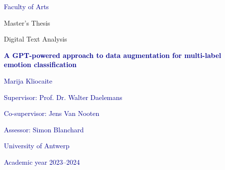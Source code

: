 \thispagestyle{plain}
    \begin{center}
    
        \vspace*{1cm}

        \large
        \textcolor{darkblue}{Faculty of Arts}
        
        \vspace{0.5cm}
        Master’s Thesis 
        
        \vspace{0.5cm}
        Digital Text Analysis 
        
       \vspace{1.5cm}
            
        \Huge
        \textcolor{darkblue}{\textbf{A GPT-powered approach 
to data augmentation for 
multi-label emotion 
classification}}
            
        \vspace{0.5cm}
        \LARGE
        \textcolor{darkblue}{}
            
        \vspace{1.5cm}
        
        \Large    
        \textcolor{darkblue}{Marija Kliocaite}
        
        \vspace{0.5cm}
        
        \large
        \textcolor{darkblue}{Supervisor: Prof. Dr. Walter Daelemans}
        
        \vspace{0.5cm}
        \textcolor{darkblue}{Co-supervisor: Jens Van Nooten}
        
        \vspace{0.5cm}
        \textcolor{darkblue}{Assessor: Simon Blanchard}
        
        \vspace{1cm}
        \textcolor{darkblue}{University of Antwerp}
        
        \vspace{1cm}   
        \textcolor{darkblue}{Academic year 2023–2024}
            
    \end{center}